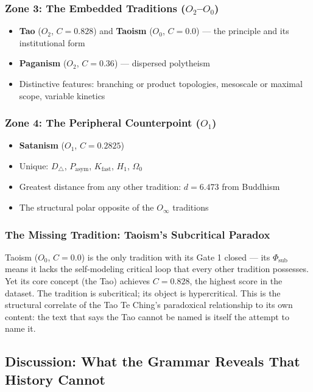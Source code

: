 \documentclass[12pt,a4paper]{article}
\begin{document}
\subsubsection{Zone 3: The Embedded Traditions ($O_2$--$O_0$)}

\begin{itemize}
    \item \textbf{Tao} ($O_2$, $C = 0.828$) and \textbf{Taoism} ($O_0$, $C = 0.0$) --- the principle and its institutional form
    \item \textbf{Paganism} ($O_2$, $C = 0.36$) --- dispersed polytheism
    \item Distinctive features: branching or product topologies, mesoscale or maximal scope, variable kinetics
\end{itemize}

\subsubsection{Zone 4: The Peripheral Counterpoint ($O_1$)}

\begin{itemize}
    \item \textbf{Satanism} ($O_1$, $C = 0.2825$)
    \item Unique: $D_{\triangle}$, $P_\text{asym}$, $K_\text{fast}$, $H_1$, $\Omega_0$
    \item Greatest distance from any other tradition: $d = 6.473$ from Buddhism
    \item The structural polar opposite of the $O_{\infty}$ traditions
\end{itemize}

\subsubsection{The Missing Tradition: Taoism's Subcritical Paradox}

Taoism ($O_0$, $C = 0.0$) is the only tradition with its Gate 1 closed --- its $\Phi_\text{sub}$ means it lacks the self-modeling critical loop that every other tradition possesses. Yet its core concept (the Tao) achieves $C = 0.828$, the highest score in the dataset. The tradition is subcritical; its object is hypercritical. This is the structural correlate of the Tao Te Ching's paradoxical relationship to its own content: the text that says the Tao cannot be named is itself the attempt to name it.

\subsection{Discussion: What the Grammar Reveals That History Cannot}
\end{document}
